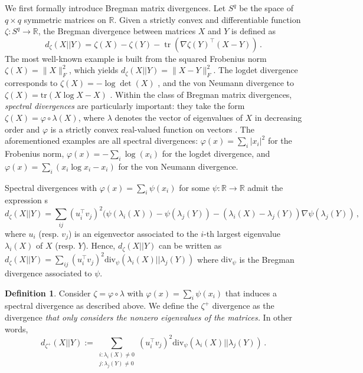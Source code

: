 \documentclass{article}
\theoremstyle{plain}
\theoremstyle{definition}
\newtheorem{definition}[theorem]{Definition}
\theoremstyle{remark}
\def\tr{{\operatorname{tr}}}
\def\R{{\mathbb{R}}}
\begin{document}
{We first formally introduce Bregman matrix divergences. 
Let $S^q$ be the space of $q\times q$ symmetric matrices on $\R$.
Given a strictly convex and differentiable function $\zeta: S^q \to \R$, 
the Bregman divergence between matrices $X$ and $Y$ is defined as
\begin{equation}
\label{eq:bregman_div_matric}
d_\zeta(X||Y) = \zeta(X) - \zeta(Y) - \tr \left(\nabla\zeta(Y)^\top (X- Y)\right) \,.
\end{equation}
The most well-known example is built from the squared Frobenius norm $\zeta(X) = \|X\|_F^2$, 
which yields $d_\zeta(X||Y) = \|X - Y\|_F^2$. 
The logdet divergence corresponds to $\zeta(X) = -\log \det(X)$ \citep{james1961estimation}, 
and the von Neumann divergence to $\zeta(X) = \mathrm{tr}(X \log X - X)$ \citep{von1927thermodynamik}. 
Within the class of Bregman matrix divergences, \emph{spectral divergences} are particularly important: 
they take the form $\zeta(X) = \varphi \circ \lambda(X)$, 
where $\lambda$ denotes the vector of eigenvalues of $X$ in decreasing order and 
$\varphi$ is a strictly convex real-valued function on vectors \citep{kulis2009low}. 
The aforementioned examples are all spectral divergences: $\varphi(x) = \sum_i |x_i|^2$ 
for the Frobenius norm, $\varphi(x) = -\sum_i \log(x_i)$ for the logdet divergence, 
and $\varphi(x) = \sum_i (x_i \log x_i - x_i)$ for the von Neumann divergence.

Spectral divergences with $\varphi(x) = \sum_i \psi(x_i)$ for some $\psi : \R \to \R$ admit the expression
 \citep[Lemma 1]{kulis2009low} s
\begin{equation}
d_{\zeta}(X || Y) = \sum_{ij} (u_i^\top v_j)^2(\psi(\lambda_i(X))- \psi(\lambda_j(Y)) -(\lambda_i(X)-\lambda_j(Y))\nabla \psi(\lambda_j(Y))\,,
\end{equation}
where $u_i$ (resp. $v_j$) is an eigenvector associated to the $i$-th largest eigenvalue $\lambda_i(X)$ 
of $X$ (resp. $Y$). 
Hence, $d_{\zeta}(X || Y)$ can be written as $d_{\zeta}(X || Y) = \sum_{ij} (u_i^\top v_j)^2 
\text{div}_\psi(\lambda_i(X) || \lambda_j(Y))$ where $\text{div}_\psi$ is the Bregman divergence associated to $\psi$.
\begin{definition}
    \label{def:plusdiv}
Consider $\zeta = \varphi \circ \lambda$ with $\varphi(x) = \sum_i \psi(x_i)$ that induces a spectral divergence as described above. 
We define the $\zeta^+$ divergence as the divergence {\em that only considers the nonzero eigenvalues of the matrices.}
In other words, 
\begin{equation}
    \label{eq:divplusdivergence}
d_{\zeta^+}(X || Y) := \sum_{\begin{smallmatrix}i: \lambda_i(X) \neq 0 \\ j: \lambda_j(Y) \neq 0 \end{smallmatrix}} (u_i^\top v_j)^2  \text{div}_\psi(\lambda_i(X) || \lambda_j(Y))\,.
\end{equation}
\end{definition}

}
\end{document}
